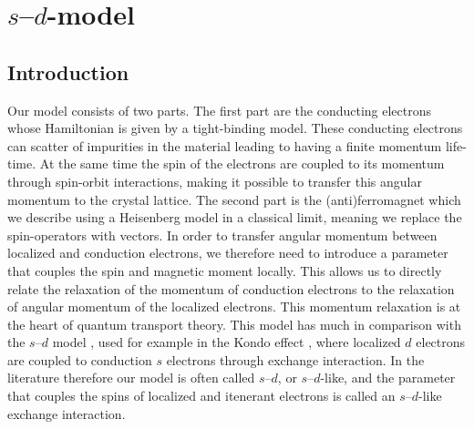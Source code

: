 \chapter{$s$--$d$-model}\label{ch:sdmodel}
\section{Introduction}
Our model consists of two parts. The first part are the conducting electrons whose Hamiltonian is given by a tight-binding model. These conducting electrons can scatter of impurities in the material leading to having a finite momentum life-time. At the same time the spin of the electrons are coupled to its momentum through spin-orbit interactions, making it possible to transfer this angular momentum to the crystal lattice. The second part is the (anti)ferromagnet which we describe using a Heisenberg model in a classical limit, meaning we replace the spin-operators with vectors. In order to transfer angular momentum between localized and conduction electrons, we therefore need to introduce a parameter that couples the spin and magnetic moment locally. This allows us to directly relate the relaxation of the momentum of conduction electrons to the relaxation of angular momentum of the localized electrons. This momentum relaxation is at the heart of quantum transport theory. This model has much in comparison with the $s$--$d$ model \cite{zener1951interaction,kasuya1956theory,yosida1957magnetic,sdmodel}, used for example in the Kondo effect \cite{10.1143/PTP.32.37}, where localized $d$ electrons are coupled to conduction $s$ electrons through exchange interaction. In the literature therefore our model is often called $s$--$d$, or $s$--$d$-like, and the parameter that couples the spins of localized and itenerant electrons is called an $s$--$d$-like exchange interaction. 

